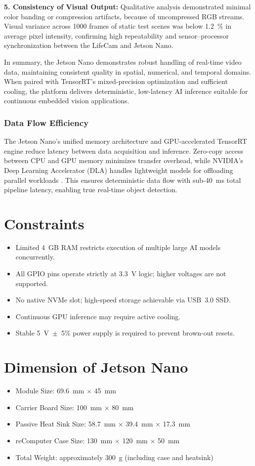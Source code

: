 \bigskip
\textbf{5. Consistency of Visual Output:}  
Qualitative analysis demonstrated minimal color banding or compression artifacts, because of uncompressed RGB streams.  
Visual variance across 1000 frames of static test scenes was below 1.2~\% in average pixel intensity, confirming high repeatability and sensor–processor synchronization between the LifeCam and Jetson Nano.  

\bigskip
In summary, the Jetson Nano demonstrates robust handling of real-time video data, maintaining consistent quality in spatial, numerical, and temporal domains.  
When paired with TensorRT’s mixed-precision optimization and sufficient cooling, the platform delivers deterministic, low-latency \ac{AI} inference suitable for continuous embedded vision applications.


\subsubsection{Data Flow Efficiency}
The Jetson Nano’s unified memory architecture and \ac{GPU}-accelerated TensorRT engine reduce latency between data acquisition and inference.  
Zero-copy access between CPU and \ac{GPU} memory minimizes transfer overhead, while NVIDIA’s Deep Learning Accelerator (DLA) handles lightweight models for offloading parallel workloads \cite{edgeAIbook,jetson_nano_doc}.  
This ensures deterministic data flow with sub-40~ms total pipeline latency, enabling true real-time object detection.

\section{Constraints}
\begin{itemize}
	\item Limited 4~GB RAM restricts execution of multiple large \ac{AI} models concurrently.
	\item All GPIO pins operate strictly at 3.3~V logic; higher voltages are not supported.
	\item No native NVMe slot; high-speed storage achievable via \ac{USB}~3.0 SSD.
	\item Continuous \ac{GPU} inference may require active cooling.
	\item Stable 5~V~$\pm$~5\% power supply is required to prevent brown-out resets.
\end{itemize}

\section{Dimension of Jetson Nano}
\begin{itemize}
	\item Module Size: 69.6~mm $\times$ 45~mm
	\item Carrier Board Size: 100~mm $\times$ 80~mm
	\item Passive Heat Sink Size:  58.7~mm $\times$  39.4~mm $\times$  17.3~mm
	\item reComputer Case  Size: 130~mm $\times$ 120~mm $\times$ 50~mm
	\item Total Weight: approximately 300~g (including case and heatsink)
\end{itemize}

